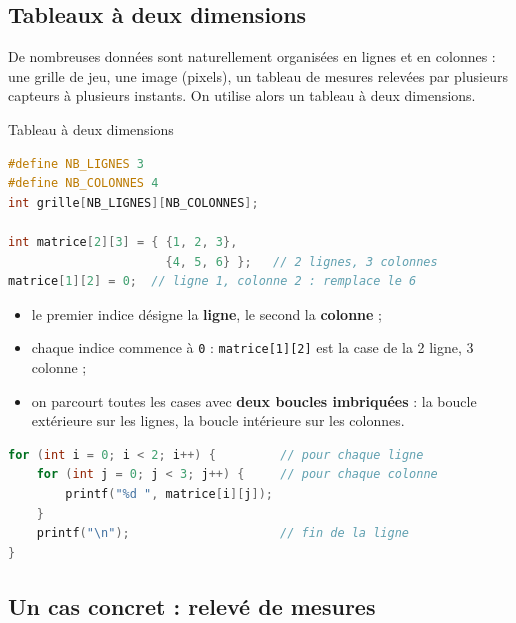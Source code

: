 \subsection{Tableaux à deux dimensions}

De nombreuses données sont naturellement organisées en lignes et en colonnes : une grille de jeu, une image (pixels), un tableau de mesures relevées par plusieurs capteurs à plusieurs instants. On utilise alors un tableau à deux dimensions.

\begin{UPSTIinfor}{Tableau à deux dimensions}
  \begin{lstlisting}[language=c,caption={Déclaration et accès}]
#define NB_LIGNES 3
#define NB_COLONNES 4
int grille[NB_LIGNES][NB_COLONNES];

int matrice[2][3] = { {1, 2, 3},
                      {4, 5, 6} };   // 2 lignes, 3 colonnes
matrice[1][2] = 0;  // ligne 1, colonne 2 : remplace le 6
\end{lstlisting}
  \begin{itemize}
    \item le premier indice désigne la \textbf{ligne}, le second la \textbf{colonne} ;
    \item chaque indice commence à \texttt{0} : \texttt{matrice[1][2]} est la case de la 2 ligne, 3 colonne ;
    \item on parcourt toutes les cases avec \textbf{deux boucles imbriquées} : la boucle extérieure sur les lignes, la boucle intérieure sur les colonnes.
  \end{itemize}
\end{UPSTIinfor}

\begin{lstlisting}[language=c,caption={Affichage d'un tableau 2D ligne par ligne},label=codeAffiche2D]
for (int i = 0; i < 2; i++) {         // pour chaque ligne
    for (int j = 0; j < 3; j++) {     // pour chaque colonne
        printf("%d ", matrice[i][j]);
    }
    printf("\n");                     // fin de la ligne
}
\end{lstlisting}


\subsection{Un cas concret : relevé de mesures}

